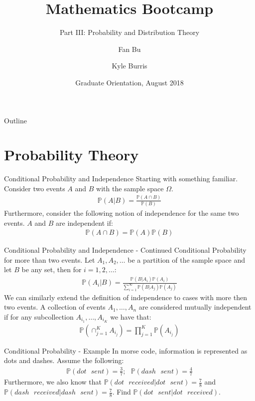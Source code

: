 \documentclass{beamer}
\title{Mathematics Bootcamp}
\subtitle{Part III: Probability and Distribution Theory}
\author{Fan Bu\inst{1} \and Kyle Burris\inst{1}}
\institute[Duke University] %
{
  \inst{1}%
  Department of Statistical Science\\
  Duke University
  }
\date{Graduate Orientation, August 2018}
\begin{document}
\begin{frame}
  \titlepage
\end{frame}

\begin{frame}{Outline}
  \tableofcontents
\end{frame}

\section{Probability Theory}
\begin{frame}{Conditional Probability and Independence}
Starting with something familiar. Consider two events $A$ and $B$ with the sample space $\Omega$. 
\begin{align*}
\mathbb{P}(A|B) = \frac{\mathbb{P}(A \cap B)}{\mathbb{P}(B)}
\end{align*}
Furthermore, consider the following notion of independence for the same two events. $A$ and $B$ are independent if:
\begin{align*}
\mathbb{P}(A \cap B) = \mathbb{P}(A)\mathbb{P}(B)
\end{align*}
\end{frame}

\begin{frame}{Conditional Probability and Independence - Continued}
Conditional Probability for more than two events. Let $A_{1}, A_{2},\ldots$ be a partition of the sample space and let $B$ be any set, then for $i = 1, 2, \ldots$:
\begin{align*}
\mathbb{P}(A_{i}|B) = \frac{\mathbb{P}(B|A_{i})\mathbb{P}(A_{i})}{\sum_{i=1}^{\infty}\mathbb{P}(B|A_{j})\mathbb{P}(A_{j})}
\end{align*}
We can similarly extend the definition of independence to cases with more then two events. A collection of events $A_{1}, \ldots, A_{n}$ are considered mutually independent if for any subcollection $A_{i_{1}},\ldots,A_{i_{K}}$ we have that:
\begin{align*}
\mathbb{P}(\cap_{j = 1}^{K}A_{i_{j}}) = \prod_{j=1}^{K}\mathbb{P}(A_{i_{j}})
\end{align*}
\end{frame}

\begin{frame}{Conditional Probability - Example}
In morse code, information is represented as dots and dashes. Assume the following:
\begin{align*}
\mathbb{P}(dot\>\>\> sent) = \frac{3}{7} ;\>\>\>
\mathbb{P}(dash \>\>\> sent) = \frac{4}{7}
\end{align*}
Furthermore, we also know that $\mathbb{P}(dot\>\>\> received | dot \>\>\> sent) = \frac{7}{8}$ and $\mathbb{P}(dash\>\>\> received | dash \>\>\> sent) = \frac{7}{8}$. Find $\mathbb{P}(dot\>\>\> sent| dot \>\>\> received)$. 
\end{frame}
\end{document}
